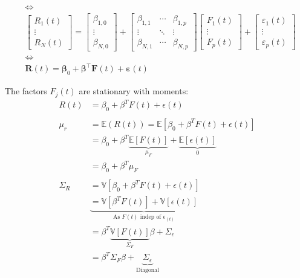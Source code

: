 \documentclass[
  oneside]{book}
\begin{document}
\[
\begin{aligned}
& \Leftrightarrow \\
& {\left[\begin{array}{c}
R_1(t) \\
\vdots \\
R_N(t)
\end{array}\right] }=\left[\begin{array}{c}
\beta_{1,0} \\
\vdots \\
\beta_{N, 0}
\end{array}\right]+\left[\begin{array}{ccc}
\beta_{1,1} & \cdots & \beta_{1, p} \\
\vdots & \ddots & \vdots \\
\beta_{N, 1} & \cdots & \beta_{N, p}
\end{array}\right]\left[\begin{array}{c}
F_1(t) \\
\vdots \\
F_p(t)
\end{array}\right]+\left[\begin{array}{c}
\varepsilon_1(t) \\
\vdots \\
\varepsilon_p(t)
\end{array}\right] \\
& \Leftrightarrow \\
& \mathbf{R}(t)=\boldsymbol{\beta}_0+\boldsymbol{\beta}^{\top} \mathbf{F}(t)+\boldsymbol{\varepsilon}(t)
\end{aligned}
\]

The factors \(F_{j}(t)\) are stationary with moments:
\[
\begin{aligned}
R(t) &= \beta_{0} + \beta^{T}F(t) + \epsilon(t)\\
\\
\mu_{r} &= \mathbb{E}(R(t)) = \mathbb{E}[\beta_{0} + \beta^{T}F(t) + \epsilon(t)]\\
&= \beta_{0}+\beta^{T}\underbrace{ \mathbb{E}[F(t)] }_{ \mu_{F} } + \underbrace{ \mathbb{E}[\epsilon(t)] }_{ 0 }\\
&= \beta_{0} + \beta^{T}\mu_{F}\\
\\
\Sigma_{R} &= \mathbb{V}[\beta_{0}+\beta^{T}F(t) +\epsilon(t)]\\
&\underbrace{= \mathbb{V}[\beta^{T}F(t)] + \mathbb{V}[\epsilon(t)]}_{ \text{As } F(t)\text{ indep of } \epsilon_(t)}\\
&= \beta^{T}\underbrace{ \mathbb{V}[F(t)] }_{ \Sigma_{F} }\beta+\Sigma_{\epsilon}\\
&= \beta^{T}\Sigma_{F}\beta+\underbrace{ \Sigma_{\epsilon} }_{ \text{Diagonal} }
\end{aligned}
\]
\end{document}

